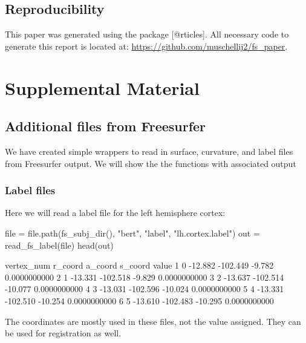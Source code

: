 \subsection{Reproducibility}\label{reproducibility}

This paper was generated using the  package
{[}@rticles{]}. All necessary code to generate this report is located
at: \url{https://github.com/muschellij2/fs_paper}.



\section{Supplemental Material}\label{supplemental-material}

\subsection{Additional files from
Freesurfer}\label{additional-files-from-freesurfer}

We have created simple wrappers to read in surface, curvature, and label
files from Freesurfer output. We will show the the functions with
associated output

\subsubsection{Label files}\label{label-files}

Here we will read a label file for the left hemisphere cortex:

\begin{Schunk}
\begin{Sinput}
file = file.path(fs_subj_dir(), "bert", "label", "lh.cortex.label")
out = read_fs_label(file)
head(out)
\end{Sinput}
\begin{Soutput}
  vertex_num r_coord  a_coord s_coord        value
1          0 -12.882 -102.449  -9.782 0.0000000000
2          1 -13.331 -102.518  -9.829 0.0000000000
3          2 -13.637 -102.514 -10.077 0.0000000000
4          3 -13.031 -102.596 -10.024 0.0000000000
5          4 -13.331 -102.510 -10.254 0.0000000000
6          5 -13.610 -102.483 -10.295 0.0000000000
\end{Soutput}
\end{Schunk}

The coordinates are mostly used in these files, not the value assigned.
They can be used for registration as well.

